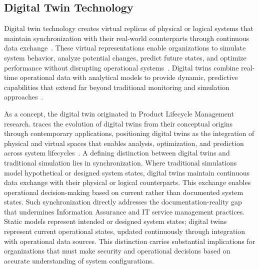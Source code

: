 \subsection{Digital Twin Technology}

Digital twin technology creates virtual replicas of physical or logical systems that maintain synchronization with their real-world counterparts through continuous data exchange~\parencite{Shao_2021}. These virtual representations enable organizations to simulate system behavior, analyze potential changes, predict future states, and optimize performance without disrupting operational systems~\parencite{madni2018leveraging}. Digital twins combine real-time operational data with analytical models to provide dynamic, predictive capabilities that extend far beyond traditional monitoring and simulation approaches~\parencite{Khan_Saad_Niyato_Han_Hong_2022}.

As a concept, the digital twin originated in Product Lifecycle Management research. \citeauthor{Grieves_2023} traces the evolution of digital twins from their conceptual origins through contemporary applications, positioning digital twins as the integration of physical and virtual spaces that enables analysis, optimization, and prediction across system lifecycles~\parencite{Grieves_2023}. A defining distinction between digital twins and traditional simulation lies in synchronization. Where traditional simulations model hypothetical or designed system states, digital twins maintain continuous data exchange with their physical or logical counterparts. This exchange enables operational decision-making based on current rather than documented system states. Such synchronization directly addresses the documentation-reality gap that undermines Information Assurance and IT service management practices. Static models represent intended or designed system states; digital twins represent current operational states, updated continuously through integration with operational data sources. This distinction carries substantial implications for organizations that must make security and operational decisions based on accurate understanding of system configurations.

